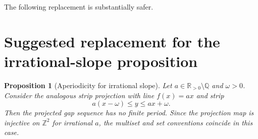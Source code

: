 \documentclass[11pt]{article}
\newtheorem{proposition}{Proposition}
\begin{document}
The following replacement is substantially safer.

\section*{Suggested replacement for the irrational-slope proposition}

\begin{proposition}[Aperiodicity for irrational slope]\label{prop:irrational_replacement}
Let \(a \in \mathbb{R}_{>0}\setminus\mathbb{Q}\) and \(\omega>0\).  Consider
the analogous strip projection with line \(f(x)=ax\) and strip
\[
    a(x-\omega)\le y\le ax+\omega.
\]
Then the projected gap sequence has no finite period.  Since the projection
map is injective on \(\mathbb Z^2\) for irrational \(a\), the multiset and set
conventions coincide in this case.
\end{proposition}
\end{document}
